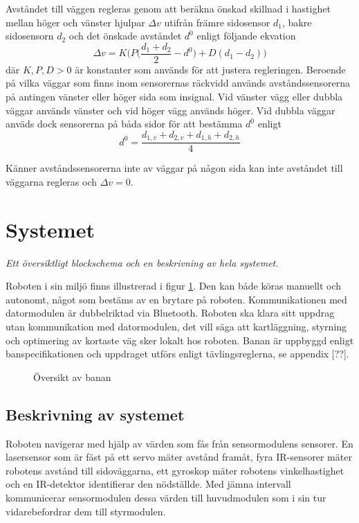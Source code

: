 \documentclass[11pt]{article}
\begin{document}
\begin{flushleft}
Avståndet till väggen regleras genom att beräkna önskad skillnad i hastighet mellan höger och vänster hjulpar $\Delta v$ utifrån främre sidosensor $d_1$, bakre sidosensorn $d_2$ och det önskade avståndet $d^0$ enligt följande ekvation
\begin{equation*}
	\Delta v = K \Bigg( P \Big( \frac {d_1 + d_2} {2} - d^0 \Big) + D (d_1 - d_2) \Bigg)
\end{equation*}
där $K, P, D > 0$ är konstanter som används för att justera regleringen. Beroende på vilka väggar som finns inom sensorernas räckvidd används avståndssensorerna på antingen vänster eller höger sida som insignal. Vid vänster vägg eller dubbla väggar används vänster och vid höger vägg används höger. Vid dubbla väggar anväds dock sensorerna på båda sidor för att bestämma  $d^0$ enligt
\begin{equation*}
	d^0 = \frac {d_{1,v} + d_{2,v} + d_{1,h} + d_{2,h}} {4}
\end{equation*}

Känner avståndssensorerna inte av väggar på någon sida kan inte avståndet till väggarna regleras och $\Delta v = 0$.

\section{Systemet}
\textit{Ett översiktligt blockschema och en beskrivning av hela systemet.}

Roboten i sin miljö finns illustrerad i figur \ref{system}. Den kan både köras manuellt och autonomt, något som bestäms av en brytare på roboten. Kommunikationen med datormodulen är dubbelriktad via Bluetooth\textsuperscript{\circledR}. Roboten ska klara sitt uppdrag utan kommunikation med datormodulen, det vill säga att kartläggning, styrning och optimering av kortaste väg sker lokalt hos roboten. Banan är uppbyggd enligt banspecifikationen och uppdraget utförs enligt tävlingsreglerna, se appendix [??].

\begin{figure}[htbp]
\centering
\noindent\resizebox{.8\linewidth}{!}{
	}
	\caption{Översikt av banan\label{system}}	
\end{figure}

\subsection{Beskrivning av systemet}

Roboten navigerar med hjälp av värden som fås från sensormodulens sensorer. En lasersensor som är fäst på ett servo mäter avstånd framåt, fyra IR-sensorer mäter robotens avstånd till sidoväggarna, ett gyroskop mäter robotens vinkelhastighet och en IR-detektor identifierar den nödställde. Med jämna intervall kommunicerar sensormodulen dessa värden till huvudmodulen som i sin tur vidarebefordrar dem till styrmodulen. 



\end{flushleft}
\end{document}

